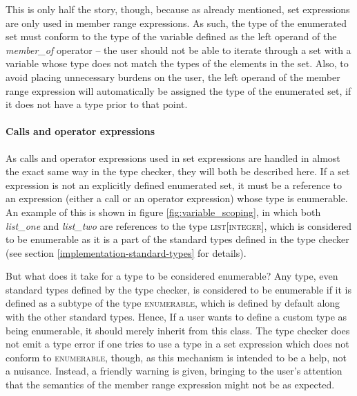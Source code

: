 This is only half the story, though, because as already mentioned, set expressions are only used in member range expressions. As such, the type of the enumerated set must conform to the type of the variable defined as the left operand of the \textit{member\_of} operator -- the user should not be able to iterate through a set with a variable whose type does not match the types of the elements in the set. Also, to avoid placing unnecessary burdens on the user, the left operand of the member range expression will automatically be assigned the type of the enumerated set, if it does not have a type prior to that point.
\paragraph{Calls and operator expressions}
As calls and operator expressions used in set expressions are handled in almost the exact same way in the type checker, they will both be described here. If a set expression is not an explicitly defined enumerated set, it must be a reference to an expression (either a call or an operator expression) whose type is enumerable. An example of this is shown in figure \ref{fig:variable_scoping}, in which both \textit{list\_one} and  \textit{list\_two} are references to the type \textsc{list}[\textsc{integer}], which is considered to be enumerable as it is a part of the standard types defined in the type checker (see section \ref{implementation-standard-types} for details).

But what does it take for a type to be considered enumerable? Any type, even standard types defined by the type checker, is considered to be enumerable if it is defined as a subtype of the type \textsc{enumerable}, which is defined by default along with the other standard types. Hence, If a user wants to define a custom type as being enumerable, it should merely inherit from this class. The type checker does not emit a type error if one tries to use a type in a set expression which does not conform to \textsc{enumerable}, though, as this mechanism is intended to be a help, not a nuisance. Instead, a friendly warning is given, bringing to the user's attention that the semantics of the member range expression might not be as expected.

